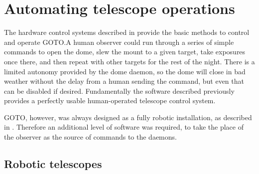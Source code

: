 \section{Automating telescope operations}
\label{sec:something}
\begin{colsection}


\begin{colsection}

The hardware control systems described in  provide the basic methods to control and operate GOTO.\@ A human observer could run through a series of simple commands to open the dome, slew the mount to a given target, take exposures once there, and then repeat with other targets for the rest of the night. There is a limited autonomy provided by the dome daemon, so the dome will close in bad weather without the delay from a human sending the command, but even that can be disabled if desired. Fundamentally the software described previously provides a perfectly usable human-operated telescope control system.

GOTO, however, was always designed as a fully robotic installation, as described in . Therefore an additional level of software was required, to take the place of the observer as the source of commands to the daemons.

\end{colsection}


\subsection{Robotic telescopes}
\label{sec:robotic_telescopes}
\begin{colsection}


\end{colsection}
\end{colsection}
